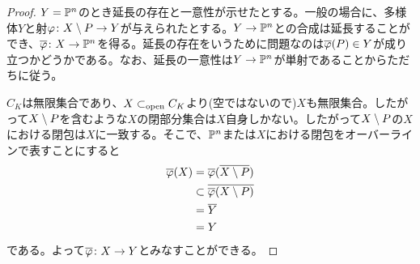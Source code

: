 \begin{proof}
  $Y = \P^n$のとき延長の存在と一意性が示せたとする。一般の場合に、多様体$Y$と射$\vp \colon X \sm P \to Y$が与えられたとする。$Y \to \P^n$との合成は延長することができ、$\ol{\vp} \colon X \to \P^n$を得る。延長の存在をいうために問題なのは$\ol{\vp}(P) \in Y$が成り立つかどうかである。なお、延長の一意性は$Y \to \P^n$が単射であることからただちに従う。

  $C_K$は無限集合であり、$X \opsub C_K$より(空ではないので)$X$も無限集合。したがって$X \sm P$を含むような$X$の閉部分集合は$X$自身しかない。したがって$X \sm P$の$X$における閉包は$X$に一致する。そこで、$\P^n$または$X$における閉包をオーバーラインで表すことにすると
  \begin{align*}
    \ol{\vp}(X) &= \ol{\vp}( \ol{X \sm P}) \\
    &\subset \ol{  \ol{\vp}(X \sm P) } \\
    &= \ol{Y} \\
    &= Y
  \end{align*}
  である。よって$\ol{\vp} \colon X \to Y$とみなすことができる。
\end{proof}




